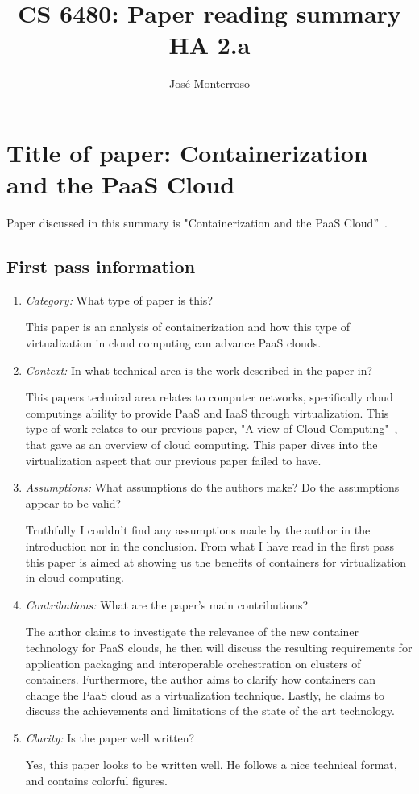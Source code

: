 \documentclass[letterpaper,twocolumn,10pt]{article}
\title{CS 6480: Paper reading summary\\
HA 2.a\\}
\author{José Monterroso}
\affil{School of Computing, University of Utah}
\begin{document}
\maketitle

\section{Title of paper: Containerization and the PaaS Cloud}

Paper discussed in this summary is "Containerization and the PaaS Cloud''~\cite{containerization}.

\subsection{First pass information}
\label{sec:first}

\begin{enumerate}

\item {\it Category:} What type of paper is this? 

This paper is an analysis of containerization and how this type of virtualization in cloud computing can advance 
PaaS clouds. 

\item {\it Context:} In what technical area is the work described in the paper in?

This papers technical area relates to computer networks, specifically cloud computings ability to provide PaaS and IaaS through
virtualization. 
This type of work relates to our previous paper, "A view of Cloud Computing"~\cite{aview}, that gave as an overview of cloud
computing. This paper dives into the virtualization aspect that our previous paper failed to have. 

\item {\it Assumptions:}  What assumptions do the authors make? Do the assumptions appear to be valid?

Truthfully I couldn't find any assumptions made by the author in the introduction nor in the conclusion. From what I have read in 
the first pass this paper is aimed at showing us the benefits of containers for virtualization in cloud computing. 

\item {\it Contributions:} What are the paper's main contributions?

The author claims to investigate the relevance of the new container technology for PaaS clouds, he then will discuss
the resulting requirements for application packaging and interoperable orchestration on clusters of containers. Furthermore, the author
aims to clarify how containers can change the PaaS cloud as a virtualization technique. Lastly, he claims to discuss the achievements
and limitations of the state of the art technology.

\item {\it Clarity:} Is the paper well written?

Yes, this paper looks to be written well. He follows a nice technical format, and contains colorful figures. 

\end{enumerate}
\end{document}
